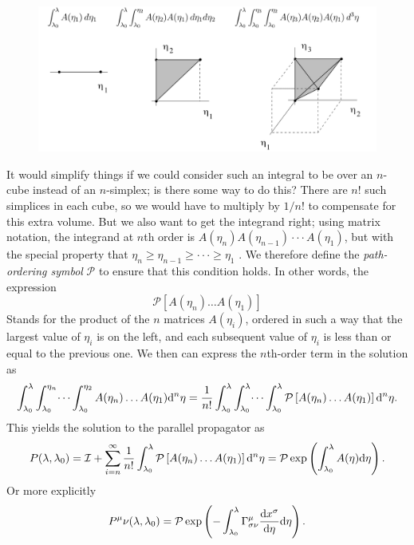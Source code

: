 \begin{figure}[h!]
	\centering
	\includegraphics[width=0.7\linewidth]{gfx/SolutionGeodesicEquation}
	\caption{}
	\label{fig:solutiongeodesicequation}
\end{figure}

It would simplify things if we could consider such an integral to be over an $n$-cube
instead of an $n$-simplex; is there some way to do this? There are $n!$ such simplices in each
cube, so we would have to multiply by $1/n!$ to compensate for this extra volume. But we
also want to get the integrand right; using matrix notation, the integrand at $n$th order
is $A(η_n )A(η_{n−1} ) · · · A(η_1 )$, but with the special property that $η_n ≥ η_{n−1} ≥ · · · ≥ η_1$ . We
therefore define the \emph{path-ordering symbol} $\mathcal{P}$ to ensure that this condition holds. In
other words, the expression
\begin{equation}
	\mathcal{P}\left[A(\eta_n) \dots A(\eta_1)\right]
\end{equation}
Stands for the product of the $n$ matrices $A(η_i )$, ordered in such a way that the largest value
of $η_i$ is on the left, and each subsequent value of $η_i$ is less than or equal to the previous one.
We then can express the $n$th-order term in the solution as
\begin{equation}
	\int_{\lambda_0}^\lambda \int_{\lambda_0}^{\eta_n} \dots \int_{\lambda_0}^{\eta_2} A(\eta_n) \dots A(\eta_1) \mathrm{d}^n \eta = \frac{1}{n!}\int_{\lambda_0}^\lambda \int_{\lambda_0}^\lambda \dots \int_{\lambda_0}^\lambda \mathcal{P}\left[A(\eta_n) \dots A(\eta_1)\right] \mathrm{d}^n \eta.
\end{equation}
This yields the solution to the parallel propagator as
\begin{equation}
	P(\lambda,\lambda_0) = \mathcal{I} + \sum_{i=n}^{\infty} \frac{1}{n!} \int_{\lambda_0}^\lambda  \mathcal{P}\left[A(\eta_n) \dots A(\eta_1)\right] \mathrm{d}^n \eta = \mathcal{P} \exp\left(\int_{\lambda_0}^\lambda A(\eta) \mathrm{d} \eta\right).
\end{equation}
Or more explicitly
\begin{equation}
	P^\mu\nu (\lambda, \lambda_0) = \mathcal{P} \exp \left(-\int_{\lambda_0}^\lambda \Gamma^\mu_{\sigma \nu} \frac{\mathrm{d} x^\sigma}{\mathrm{d} \eta}  \mathrm{d} \eta\right).
\end{equation}
